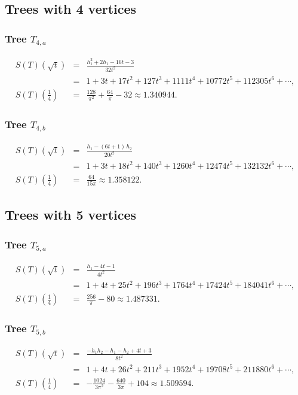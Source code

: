 \documentclass[12pt]{amsart}
\theoremstyle{plain}
\theoremstyle{remark}
\begin{document}
\medskip 
\subsection{Trees with 4 vertices}
\subsubsection{Tree $T_{4,a}$}
\begin{eqnarray*}
S(T)(\sqrt{t}) 
& = & 
\frac{h_1^{2}+2 h_1-16 t -3}{32 t^{2}} \\
& = & 
1+3 t +17 t^{2}+127 t^{3}+1111 t^{4}+10772 t^{5}+112305 t^{6}+\cdots,\\
S(T)\left( \frac14\right)
& = & 
\frac{128}{\pi^{2}}+\frac{64}{\pi}-32 
\approx 1.340944
.
\end{eqnarray*}


\subsubsection{Tree $T_{4,b}$}\label{sec:star_s=3}
\begin{eqnarray*}
S(T)(\sqrt{t}) 
& = & 
\frac{ h_1 - 
\left(6 t +1\right) \, h_2 }{20 t^{2}}
 \\
& = & 
1+3 t +18 t^{2}+140 t^{3}+1260 t^{4}+12474 t^{5}+132132 t^{6}+\cdots, \\
S(T)\left( \frac14\right)
& = & 
\frac{64}{15 \pi} 
\approx 1.358122
.
\end{eqnarray*}

\medskip 
\subsection{Trees with 5 vertices}
\subsubsection{Tree $T_{5,a}$}
\begin{eqnarray*}
S(T)(\sqrt{t}) 
& = & 
\frac{ h_1-4 t -1}{4 t^{2}}
 \\
& = & 
1+4 t +25 t^{2}+196 t^{3}+1764 t^{4}+17424 t^{5}+184041 t^{6}+\cdots, \\
S(T)\left( \frac14\right)
& =& 
\frac{256}{\pi}-80 
\approx 1.487331
.
\end{eqnarray*}

\subsubsection{Tree $T_{5,b}$}
\begin{eqnarray*}
S(T)(\sqrt{t}) 
& = & 
\frac{- h_1 h_2
- h_1
- h_2+ 4 t +3}{8 t^{2}} \\
& = & 
1+4 t +26 t^{2}+211 t^{3}+1952 t^{4}+19708 t^{5}+211880 t^{6}+\cdots,  \\
S(T)\left( \frac14\right)
& = & 
-\frac{1024}{3 \pi^{2}}-\frac{640}{3 \pi}+104 
\approx 1.509594
.
\end{eqnarray*}
\end{document}
